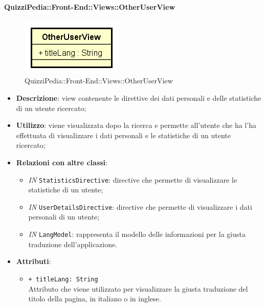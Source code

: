 \paragraph{QuizziPedia::Front-End::Views::OtherUserView}
\begin{figure} [ht]
	\centering
	\includegraphics[scale=0.80]{UML/Classi/Front-End/QuizziPedia_Front-end_Views_OtherUserView.png}
	\caption{QuizziPedia::Front-End::Views::OtherUserView}
\end{figure} \FloatBarrier
\begin{itemize}
	\item \textbf{Descrizione}: view contenente le direttive dei dati personali e delle statistiche di un utente ricercato;
	\item \textbf{Utilizzo}: viene visualizzata dopo la ricerca e permette all'utente che ha l'ha effettuata di visualizzare i dati personali e le statistiche di un utente ricercato;
	\item \textbf{Relazioni con altre classi}:
	\begin{itemize}
		\item \textit{IN} \texttt{StatisticsDirective}: directive che permette di visualizzare le statistiche di un utente;
		\item \textit{IN} \texttt{UserDetailsDirective}: directive che permette di visualizzare i dati personali di un utente;
		\item \textit{IN} \texttt{LangModel}: rappresenta il modello delle informazioni per la giusta traduzione dell'applicazione.
	\end{itemize}
	\item \textbf{Attributi}:
	\begin{itemize}
		\item \texttt{+ titleLang: String} \\ Attributo che viene utilizzato per visualizzare la giusta traduzione del titolo della pagina, in italiano o in inglese.
	\end{itemize}
\end{itemize}


